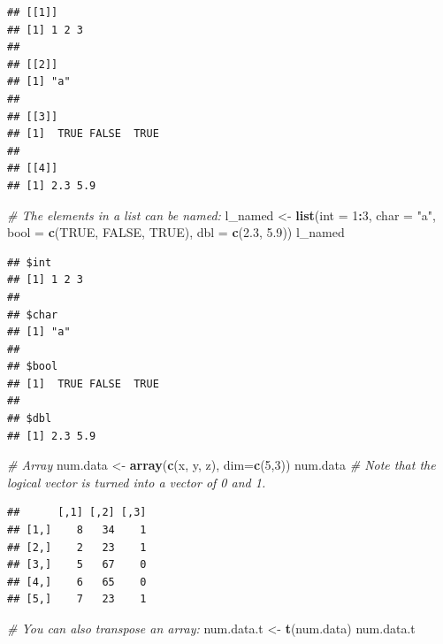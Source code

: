 \documentclass[
]{article}
\newenvironment{Shaded}{\begin{snugshade}}{\end{snugshade}}
\newcommand{\CommentTok}[1]{\textcolor[rgb]{0.56,0.35,0.01}{\textit{#1}}}
\newcommand{\DataTypeTok}[1]{\textcolor[rgb]{0.13,0.29,0.53}{#1}}
\newcommand{\DecValTok}[1]{\textcolor[rgb]{0.00,0.00,0.81}{#1}}
\newcommand{\FloatTok}[1]{\textcolor[rgb]{0.00,0.00,0.81}{#1}}
\newcommand{\KeywordTok}[1]{\textcolor[rgb]{0.13,0.29,0.53}{\textbf{#1}}}
\newcommand{\NormalTok}[1]{#1}
\newcommand{\OperatorTok}[1]{\textcolor[rgb]{0.81,0.36,0.00}{\textbf{#1}}}
\newcommand{\OtherTok}[1]{\textcolor[rgb]{0.56,0.35,0.01}{#1}}
\newcommand{\StringTok}[1]{\textcolor[rgb]{0.31,0.60,0.02}{#1}}
\begin{document}
\begin{verbatim}
## [[1]]
## [1] 1 2 3
## 
## [[2]]
## [1] "a"
## 
## [[3]]
## [1]  TRUE FALSE  TRUE
## 
## [[4]]
## [1] 2.3 5.9
\end{verbatim}

\begin{Shaded}
\begin{Highlighting}[]
\CommentTok{# The elements in a list can be named:}
\NormalTok{l_named <-}\StringTok{ }\KeywordTok{list}\NormalTok{(}\DataTypeTok{int =} \DecValTok{1}\OperatorTok{:}\DecValTok{3}\NormalTok{, }\DataTypeTok{char =} \StringTok{"a"}\NormalTok{, }\DataTypeTok{bool =} \KeywordTok{c}\NormalTok{(}\OtherTok{TRUE}\NormalTok{, }\OtherTok{FALSE}\NormalTok{, }\OtherTok{TRUE}\NormalTok{), }\DataTypeTok{dbl =} \KeywordTok{c}\NormalTok{(}\FloatTok{2.3}\NormalTok{, }\FloatTok{5.9}\NormalTok{))}
\NormalTok{l_named}
\end{Highlighting}
\end{Shaded}

\begin{verbatim}
## $int
## [1] 1 2 3
## 
## $char
## [1] "a"
## 
## $bool
## [1]  TRUE FALSE  TRUE
## 
## $dbl
## [1] 2.3 5.9
\end{verbatim}

\begin{Shaded}
\begin{Highlighting}[]
\CommentTok{# Array}
\NormalTok{num.data <-}\StringTok{ }\KeywordTok{array}\NormalTok{(}\KeywordTok{c}\NormalTok{(x, y, z), }\DataTypeTok{dim=}\KeywordTok{c}\NormalTok{(}\DecValTok{5}\NormalTok{,}\DecValTok{3}\NormalTok{))}
\NormalTok{num.data }\CommentTok{# Note that the logical vector is turned into a vector of 0 and 1.}
\end{Highlighting}
\end{Shaded}

\begin{verbatim}
##      [,1] [,2] [,3]
## [1,]    8   34    1
## [2,]    2   23    1
## [3,]    5   67    0
## [4,]    6   65    0
## [5,]    7   23    1
\end{verbatim}

\begin{Shaded}
\begin{Highlighting}[]
\CommentTok{# You can also transpose an array:}
\NormalTok{num.data.t <-}\StringTok{ }\KeywordTok{t}\NormalTok{(num.data)}
\NormalTok{num.data.t}
\end{Highlighting}
\end{Shaded}
\end{document}

